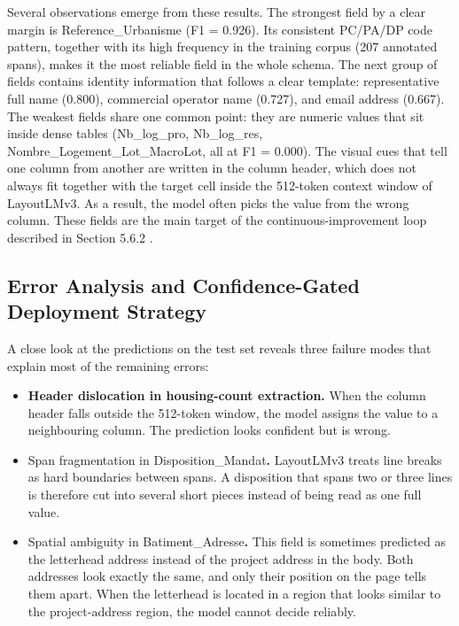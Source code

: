 Several observations emerge from these results. The strongest field by a clear margin is Reference\_Urbanisme (F1 = 0.926). Its consistent PC/PA/DP code pattern, together with its high frequency in the training corpus (207 annotated spans), makes it the most reliable field in the whole schema. The next group of fields contains identity information that follows a clear template: representative full name (0.800), commercial operator name (0.727), and email address (0.667). The weakest fields share one common point: they are numeric values that sit inside dense tables (Nb\_log\_pro, Nb\_log\_res, Nombre\_Logement\_Lot\_MacroLot, all at F1 = 0.000). The visual cues that tell one column from another are written in the column header, which does not always fit together with the target cell inside the 512-token context window of LayoutLMv3. As a result, the model often picks the value from the wrong column. These fields are the main target of the continuous-improvement loop described in Section 5.6.2 .

\subsection{Error Analysis and Confidence-Gated Deployment Strategy}

A close look at the predictions on the test set reveals three failure modes that explain most of the remaining errors:

\begin{itemize}
  \item \textbf{Header dislocation in housing-count extraction.} When the column header falls outside the 512-token window, the model assigns the value to a neighbouring column. The prediction looks confident but is wrong.
  \item Span fragmentation in Disposition\_Mandat\textbf{.} LayoutLMv3 treats line breaks as hard boundaries between spans. A disposition that spans two or three lines is therefore cut into several short pieces instead of being read as one full value.
  \item Spatial ambiguity in Batiment\_Adresse\textbf{.} This field is sometimes predicted as the letterhead address instead of the project address in the body. Both addresses look exactly the same, and only their position on the page tells them apart. When the letterhead is located in a region that looks similar to the project-address region, the model cannot decide reliably.
\end{itemize}

